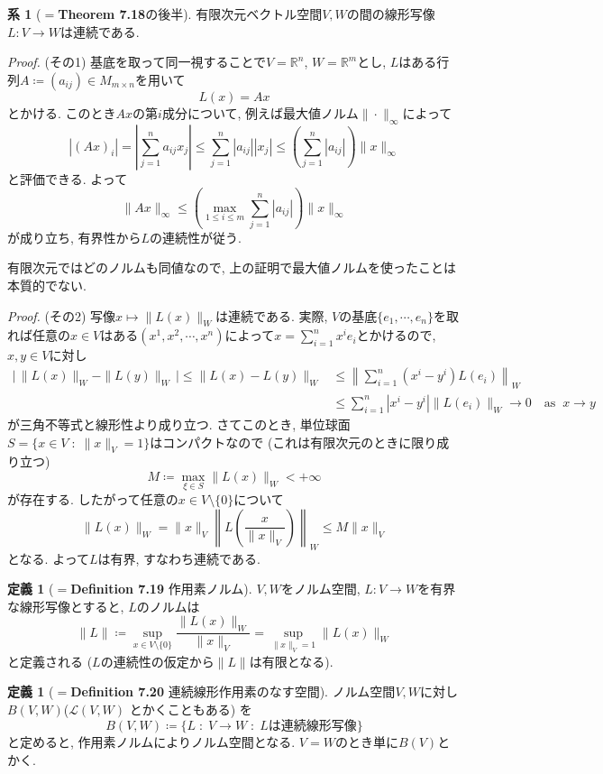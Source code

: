\documentclass{jsarticle}
\newcommand{\R}{\mathbb{R}}%
\renewenvironment{proof}[1][Proof]{%
\begin{proofbox}%
\textit{#1. }\ignorespaces
}{%
\hfill\qedsymbol%
\end{proofbox}%
}
\theoremstyle{definition}
\newtheorem{cor}[thm]{系}
\newtheorem{dfn}[thm]{定義}
\begin{document}
\begin{cor}[$=$\textbf{Theorem 7.18}の後半]
有限次元ベクトル空間$V, W$の間の線形写像$L \colon V \to W$は連続である.
\end{cor}
\begin{proof}(その1)
基底を取って同一視することで$V=\R^n$, $W=\R^m$とし, $L$はある行列$A\coloneq (a_{ij})\in M_{m\times n}$を用いて
\[
L(x) = Ax
\]
とかける. このとき$Ax$の第$i$成分について, 例えば最大値ノルム$\|\cdot\|_\infty$によって
\[
|(Ax)_i| = \left|\sum_{j=1}^n a_{ij} x_j\right| \le \sum_{j=1}^n |a_{ij}||x_j| \le \left(\sum_{j=1}^n |a_{ij}|\right) \|x\|_\infty
\]
と評価できる. よって
\[
\|Ax\|_\infty\le \left(\max_{1\le i \le m}\sum_{j=1}^n |a_{ij}|\right) \|x\|_\infty
\]
が成り立ち, 有界性から$L$の連続性が従う. 
\end{proof}
有限次元ではどのノルムも同値なので, 上の証明で最大値ノルムを使ったことは本質的でない.

\begin{proof}(その2)
写像$x \mapsto \|L(x)\|_W$は連続である. 実際, $V$の基底$\{e_1, \cdots, e_n\}$を取れば任意の$x\in V$はある$(x^1, x^2, \cdots, x^n)$によって$x=\sum_{i=1}^n x^i e_i$とかけるので, $x, y\in V$に対し
\begin{align*}
\Big|\,\|L(x)\|_{W}-\|L(y)\|_W\,\Big| \le \|L(x)-L(y)\|_W&\le \left\lVert \sum_{i=1}^n (x^i-y^i)L(e_i) \right\rVert_{W} \\
&\le \sum_{i=1}^n |x^i-y^i|\|L(e_i)\|_{W} \to 0\hspace{1em}\text{as}\;\;x\to y
\end{align*}
が三角不等式と線形性より成り立つ. さてこのとき, 単位球面$S=\{x\in V\;\colon\; \|x\|_V=1\}$はコンパクトなので (これは有限次元のときに限り成り立つ)
\[
M\coloneq \max_{\xi\in S} \|L(x)\|_W < +\infty
\]
が存在する. したがって任意の$x\in V\setminus\{0\}$について
\[
\|L(x)\|_W=\|x\|_V \left\lVert L\left(\dfrac{x}{\|x\|_V}\right) \right\rVert_W \le M\|x\|_V
\]
となる. よって$L$は有界, すなわち連続である.
\end{proof}
\begin{dfn}[$=$\textbf{Definition 7.19} 作用素ノルム]
$V, W$をノルム空間, $L \colon V \to W$を有界な線形写像とすると, $L$のノルムは
\[
\|L\|\coloneq \sup_{x\in V\setminus \{0\}}\dfrac{\|L(x)\|_W}{\|x\|_V} = \sup_{\|x\|_V=1}\|L(x)\|_W
\]
と定義される ($L$の連続性の仮定から$\|L\|$は有限となる).
\end{dfn}

\begin{dfn}[$=$\textbf{Definition 7.20} 連続線形作用素のなす空間]
ノルム空間$V, W$に対し$B(V, W)$($\mathcal L(V, W)$ とかくこともある) を
\[
B(V, W) \coloneq \{L\; \colon \; V\to W\;\colon\;L\text{は連続線形写像}\}
\]
と定めると, 作用素ノルムによりノルム空間となる. $V=W$のとき単に$B(V)$とかく.
\end{dfn}
\end{document}
